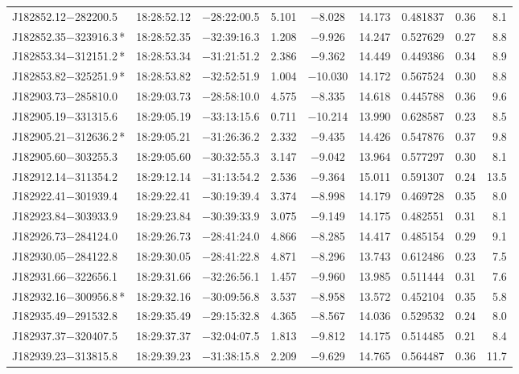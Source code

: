 \begin{table*}
\begin{tabular}{lcccccccr}
J182852.12$-$282200.5 & 18:28:52.12 & $-$28:22:00.5 &  5.101 & $-$8.028 & 14.173 & 0.481837 & 0.36 & 8.1 \\
J182852.35$-$323916.3\,* & 18:28:52.35 & $-$32:39:16.3 &  1.208 & $-$9.926 & 14.247 & 0.527629 & 0.27 & 8.8 \\
J182853.34$-$312151.2\,* & 18:28:53.34 & $-$31:21:51.2 &  2.386 & $-$9.362 & 14.449 & 0.449386 & 0.34 & 8.9 \\
J182853.82$-$325251.9\,* & 18:28:53.82 & $-$32:52:51.9 &  1.004 & $-$10.030 & 14.172 & 0.567524 & 0.30 & 8.8 \\
J182903.73$-$285810.0 & 18:29:03.73 & $-$28:58:10.0 &  4.575 & $-$8.335 & 14.618 & 0.445788 & 0.36 & 9.6 \\
J182905.19$-$331315.6 & 18:29:05.19 & $-$33:13:15.6 &  0.711 & $-$10.214 & 13.990 & 0.628587 & 0.23 & 8.5 \\
J182905.21$-$312636.2\,* & 18:29:05.21 & $-$31:26:36.2 &  2.332 & $-$9.435 & 14.426 & 0.547876 & 0.37 & 9.8 \\
J182905.60$-$303255.3 & 18:29:05.60 & $-$30:32:55.3 &  3.147 & $-$9.042 & 13.964 & 0.577297 & 0.30 & 8.1 \\
J182912.14$-$311354.2 & 18:29:12.14 & $-$31:13:54.2 &  2.536 & $-$9.364 & 15.011 & 0.591307 & 0.24 & 13.5 \\
J182922.41$-$301939.4 & 18:29:22.41 & $-$30:19:39.4 &  3.374 & $-$8.998 & 14.179 & 0.469728 & 0.35 & 8.0 \\
J182923.84$-$303933.9 & 18:29:23.84 & $-$30:39:33.9 &  3.075 & $-$9.149 & 14.175 & 0.482551 & 0.31 & 8.1 \\
J182926.73$-$284124.0 & 18:29:26.73 & $-$28:41:24.0 &  4.866 & $-$8.285 & 14.417 & 0.485154 & 0.29 & 9.1 \\
J182930.05$-$284122.8 & 18:29:30.05 & $-$28:41:22.8 &  4.871 & $-$8.296 & 13.743 & 0.612486 & 0.23 & 7.5 \\
J182931.66$-$322656.1 & 18:29:31.66 & $-$32:26:56.1 &  1.457 & $-$9.960 & 13.985 & 0.511444 & 0.31 & 7.6 \\
J182932.16$-$300956.8\,* & 18:29:32.16 & $-$30:09:56.8 &  3.537 & $-$8.958 & 13.572 & 0.452104 & 0.35 & 5.8 \\
J182935.49$-$291532.8 & 18:29:35.49 & $-$29:15:32.8 &  4.365 & $-$8.567 & 14.036 & 0.529532 & 0.24 & 8.0 \\
J182937.37$-$320407.5 & 18:29:37.37 & $-$32:04:07.5 &  1.813 & $-$9.812 & 14.175 & 0.514485 & 0.21 & 8.4 \\
J182939.23$-$313815.8 & 18:29:39.23 & $-$31:38:15.8 &  2.209 & $-$9.629 & 14.765 & 0.564487 & 0.36 & 11.7 \\

\end{tabular}
\end{table*}
